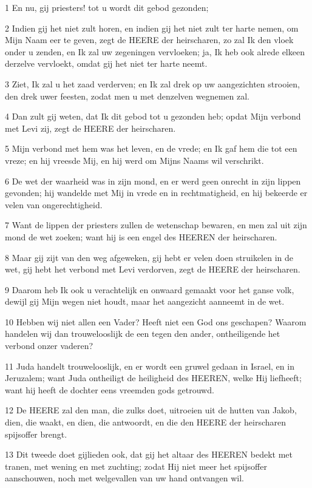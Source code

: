\par 1 En nu, gij priesters! tot u wordt dit gebod gezonden;
\par 2 Indien gij het niet zult horen, en indien gij het niet zult ter harte nemen, om Mijn Naam eer te geven, zegt de HEERE der heirscharen, zo zal Ik den vloek onder u zenden, en Ik zal uw zegeningen vervloeken; ja, Ik heb ook alrede elkeen derzelve vervloekt, omdat gij het niet ter harte neemt.
\par 3 Ziet, Ik zal u het zaad verderven; en Ik zal drek op uw aangezichten strooien, den drek uwer feesten, zodat men u met denzelven wegnemen zal.
\par 4 Dan zult gij weten, dat Ik dit gebod tot u gezonden heb; opdat Mijn verbond met Levi zij, zegt de HEERE der heirscharen.
\par 5 Mijn verbond met hem was het leven, en de vrede; en Ik gaf hem die tot een vreze; en hij vreesde Mij, en hij werd om Mijns Naams wil verschrikt.
\par 6 De wet der waarheid was in zijn mond, en er werd geen onrecht in zijn lippen gevonden; hij wandelde met Mij in vrede en in rechtmatigheid, en hij bekeerde er velen van ongerechtigheid.
\par 7 Want de lippen der priesters zullen de wetenschap bewaren, en men zal uit zijn mond de wet zoeken; want hij is een engel des HEEREN der heirscharen.
\par 8 Maar gij zijt van den weg afgeweken, gij hebt er velen doen struikelen in de wet, gij hebt het verbond met Levi verdorven, zegt de HEERE der heirscharen.
\par 9 Daarom heb Ik ook u verachtelijk en onwaard gemaakt voor het ganse volk, dewijl gij Mijn wegen niet houdt, maar het aangezicht aanneemt in de wet.
\par 10 Hebben wij niet allen een Vader? Heeft niet een God ons geschapen? Waarom handelen wij dan trouwelooslijk de een tegen den ander, ontheiligende het verbond onzer vaderen?
\par 11 Juda handelt trouwelooslijk, en er wordt een gruwel gedaan in Israel, en in Jeruzalem; want Juda ontheiligt de heiligheid des HEEREN, welke Hij liefheeft; want hij heeft de dochter eens vreemden gods getrouwd.
\par 12 De HEERE zal den man, die zulks doet, uitroeien uit de hutten van Jakob, dien, die waakt, en dien, die antwoordt, en die den HEERE der heirscharen spijsoffer brengt.
\par 13 Dit tweede doet gijlieden ook, dat gij het altaar des HEEREN bedekt met tranen, met wening en met zuchting; zodat Hij niet meer het spijsoffer aanschouwen, noch met welgevallen van uw hand ontvangen wil.
